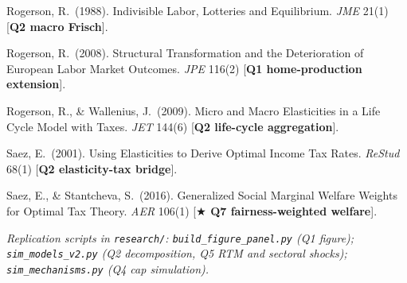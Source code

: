 \documentclass[9pt,a4paper]{extarticle}
\begin{document}
Rogerson, R.\ (1988). Indivisible Labor, Lotteries and Equilibrium.
\emph{JME} 21(1) [\textbf{Q2 macro Frisch}].

Rogerson, R.\ (2008). Structural Transformation and the Deterioration
of European Labor Market Outcomes. \emph{JPE} 116(2)
[\textbf{Q1 home-production extension}].

Rogerson, R., \& Wallenius, J.\ (2009). Micro and Macro Elasticities
in a Life Cycle Model with Taxes. \emph{JET} 144(6)
[\textbf{Q2 life-cycle aggregation}].

Saez, E.\ (2001). Using Elasticities to Derive Optimal Income Tax Rates.
\emph{ReStud} 68(1) [\textbf{Q2 elasticity-tax bridge}].

Saez, E., \& Stantcheva, S.\ (2016). Generalized Social Marginal
Welfare Weights for Optimal Tax Theory. \emph{AER} 106(1)
[\textbf{$\bigstar$ Q7 fairness-weighted welfare}].

\medskip
\noindent\emph{Replication scripts in \texttt{research/}:
\texttt{build\_figure\_panel.py} (Q1 figure);
\texttt{sim\_models\_v2.py} (Q2 decomposition, Q5 RTM and
sectoral shocks); \texttt{sim\_mechanisms.py} (Q4 cap simulation).}
\endgroup
\end{document}
